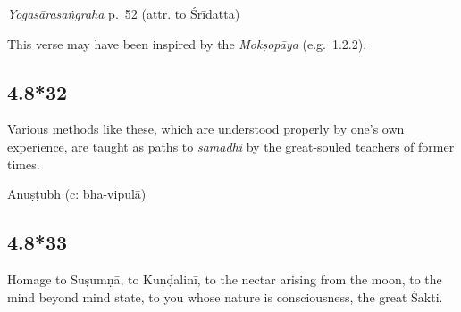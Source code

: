 \begin{ekdosis}
\begin{testimonia}[hp04_008_31]
\emph{Yogasārasaṅgraha} p.~52 (attr. to Śrīdatta)
\begin{versinnote}
\end{versinnote}
\end{testimonia}

\begin{philcomm}[hp04_008_31]
This verse may have been inspired by the \emph{Mokṣopāya} (e.g.~1.2.2).
\end{philcomm}

\subsection*{4.8*32}
\begin{translation}[hp04_008_32]
Various methods like these, which are understood properly by one's own experience, are taught as paths to \textit{samādhi} by the great-souled teachers of former times.
\end{translation}




\begin{metre}[hp04_008_32]
Anuṣṭubh (c: bha-vipulā)
\end{metre}



\subsection*{4.8*33}
\begin{translation}[hp04_008_33]
Homage to Suṣumṇā, to Kuṇḍalinī, to the nectar arising from the moon, to the mind beyond mind state, to you whose nature is consciousness, the great Śakti.%
\end{translation}


\end{ekdosis}
